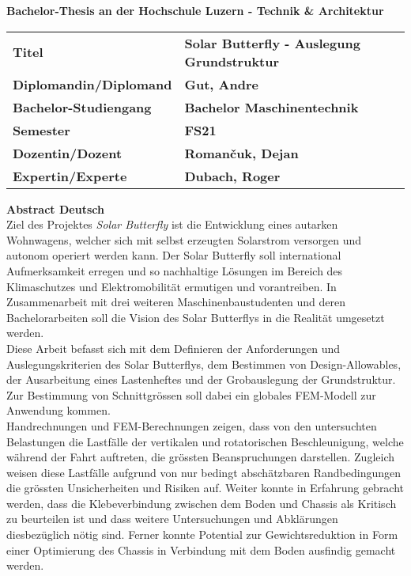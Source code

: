 \vspace{2cm}
\begin{large}
\textbf{Bachelor-Thesis an der Hochschule Luzern - Technik \& Architektur}\\
\end{large}
\vspace{1cm}

\begin{table}[H]
\small
  \begin{tabularx}{\linewidth}{llX}
    \textbf{Titel}                 & \textbf{Solar Butterfly - Auslegung Grundstruktur} &\\[4 mm]
    \textbf{Diplomandin/Diplomand} & \textbf{Gut, Andre}                                &\\[4 mm]
    \textbf{Bachelor-Studiengang}  & \textbf{Bachelor Maschinentechnik}                 &\\[4 mm]
    \textbf{Semester}              & \textbf{FS21}                                      &\\[4 mm]
    \textbf{Dozentin/Dozent}       & \textbf{Roman\v{c}uk, Dejan}                       &\\[4 mm]
    \textbf{Expertin/Experte}      & \textbf{Dubach, Roger}                             &
  \end{tabularx}
\end{table}

\vspace{1.5cm}
\textbf{Abstract Deutsch}\\
Ziel des Projektes \emph{Solar Butterfly} ist die Entwicklung eines autarken Wohnwagens, welcher sich mit selbst erzeugten Solarstrom versorgen und autonom operiert werden kann. Der Solar Butterfly soll international Aufmerksamkeit erregen und so nachhaltige Lösungen im Bereich des Klimaschutzes und Elektromobilität ermutigen und vorantreiben. In Zusammenarbeit mit drei weiteren Maschinenbaustudenten und deren Bachelorarbeiten soll die Vision des Solar Butterflys in die Realität umgesetzt werden.\\
Diese Arbeit befasst sich mit dem Definieren der Anforderungen und Auslegungskriterien des Solar Butterflys, dem Bestimmen von Design-Allowables, der Ausarbeitung eines Lastenheftes und der Grobauslegung der Grundstruktur. Zur Bestimmung von Schnittgrössen soll dabei ein globales FEM-Modell zur Anwendung kommen.\\
Handrechnungen und FEM-Berechnungen zeigen, dass von den untersuchten Belastungen die Lastfälle der vertikalen und rotatorischen Beschleunigung, welche während der Fahrt auftreten, die grössten Beanspruchungen darstellen. Zugleich weisen diese Lastfälle aufgrund von nur bedingt abschätzbaren Randbedingungen die grössten Unsicherheiten und Risiken auf. Weiter konnte in Erfahrung gebracht werden, dass die Klebeverbindung zwischen dem Boden und Chassis als Kritisch zu beurteilen ist und dass weitere Untersuchungen und Abklärungen diesbezüglich nötig sind.
Ferner konnte Potential zur Gewichtsreduktion in Form einer Optimierung des Chassis in Verbindung mit dem Boden ausfindig gemacht werden.


